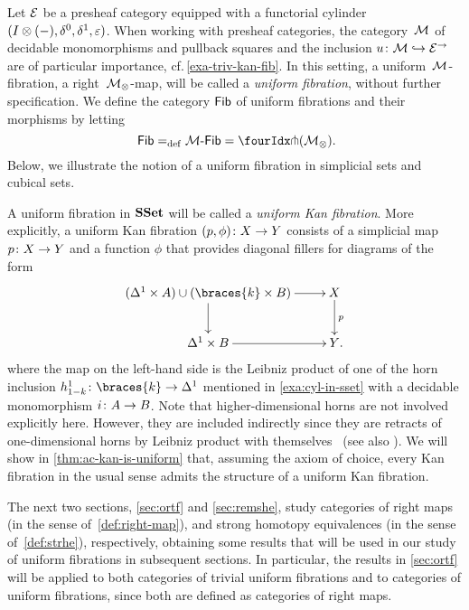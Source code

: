\documentclass[reqno,10pt,a4paper,oneside,draft]{amsart}
\begin{document}
\begin{example}
Let $\catE$ be a presheaf category equipped with a functorial cylinder $(\interval \otimes (-), \lcyl, \rcyl, \ccyl)$.
When working with presheaf categories, the category~$\cal{M}$ of decidable monomorphisms and pullback squares and the inclusion $u \co \cal{M} \hookrightarrow \catE^\to$ are of particular importance, {cf.}\,\cref{exa-triv-kan-fib}.
In this setting, a uniform~$\cal{M}$-fibration, \ie a right~$\cal{M}_\otimes$-map, will be called a \emph{uniform fibration}, without further specification.
We define the category $\Fib$ of uniform fibrations and their morphisms by letting
\[
  \Fib \defeq \Fib[\cal{M}] = \liftr{(\cal{M}_\otimes)} \rlap{.}
\]
Below, we illustrate the notion of a uniform fibration in simplicial sets and cubical sets.
\end{example}

\begin{example}
A uniform fibration in $\SSet$ will be called a \emph{uniform Kan fibration}.
More explicitly, a uniform Kan fibration $(p, \phi) \co X \to Y$ consists of a simplicial map $p \co X \to Y$ and a function $\phi$ that provides diagonal fillers for diagrams of the form
\[
\xymatrix{
  (\Delta^1 \times A) \cup (\braces{k} \times B)
  \ar[r]
  \ar[d]
&
  X
  \ar[d]^{p}
\\
  \Delta^1 \times B
  \ar[r]
&
  Y
\rlap{.}}
\]
where the map on the left-hand side is the Leibniz product of one of the horn inclusion $h_{1-k}^1 \co \braces{k} \to \Delta^1$ mentioned in \cref{exa:cyl-in-sset} with a decidable monomorphism $i \co A \to B$.
Note that higher-dimensional horns are not involved explicitly here.
However, they are included indirectly since they are retracts of one-dimensional horns by Leibniz product with themselves~\cite{joyal-quaderns} (see also \cite[Proposition 2.1.2.6]{lurie:htt}).
We will show in \cref{thm:ac-kan-is-uniform} that, assuming the axiom of choice, every Kan fibration in the usual sense admits the structure of a uniform Kan fibration.
\end{example}

\begin{example}
\end{example}


The next two sections, \cref{sec:ortf} and \cref{sec:remshe}, study categories of right maps (in the sense of~\cref{def:right-map}), and strong homotopy equivalences (in the sense of~\cref{def:strhe}), respectively, obtaining some results that will be used in our study of uniform fibrations in subsequent sections.
In particular, the results in \cref{sec:ortf} will be applied to both categories of trivial uniform fibrations and to categories of uniform fibrations, since both are defined as categories of right maps.
\end{document}
